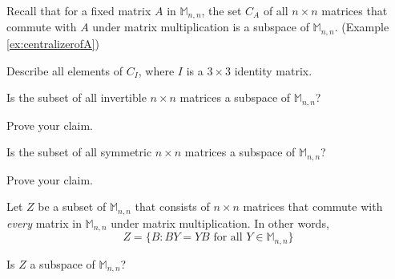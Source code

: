 \documentclass{ximera}
\begin{document}

\begin{problem}\label{prob:abstractvectspace6}
Recall that for a fixed matrix $A$ in $\mathbb{M}_{n,n}$, the set $C_A$ of all $n\times n$ matrices that commute with $A$ under matrix multiplication  is a subspace of $\mathbb{M}_{n,n}$. (Example \ref{ex:centralizerofA})

Describe all elements of $C_I$, where $I$ is a $3\times 3$ identity matrix.
\end{problem}
  
\begin{problem}\label{prob:abstractvectspace7}
Is the subset of all invertible $n\times n$ matrices a subspace of $\mathbb{M}_{n,n}$? 

\begin{multipleChoice}
  \end{multipleChoice}

Prove your claim. 
\end{problem}

\begin{problem}\label{prob:symmetricsubspace}
Is the subset of all symmetric $n\times n$ matrices a subspace of $\mathbb{M}_{n,n}$?  

\begin{multipleChoice}
  \end{multipleChoice}

Prove your claim. 
\end{problem}

\begin{problem}\label{prob:abstractvectspace8}
Let $Z$ be a subset of $\mathbb{M}_{n,n}$ that consists of $n\times n$ matrices that commute with {\it every} matrix in $\mathbb{M}_{n,n}$ under matrix multiplication. In other words,
$$Z=\{B : BY=YB \mbox{ for all } Y \in \mathbb{M}_{n,n}\}$$

Is $Z$ a subspace of $\mathbb{M}_{n,n}$?

\end{problem}
\end{document}
